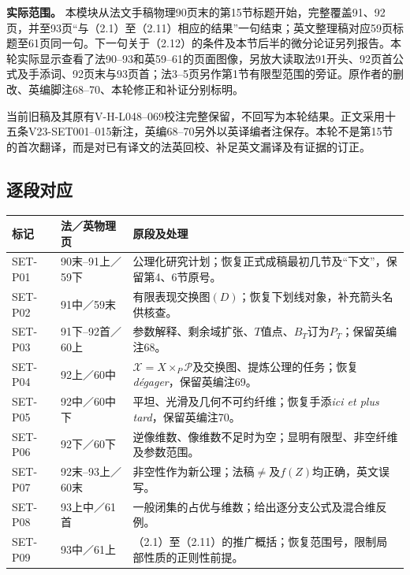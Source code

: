 
\noindent\textbf{实际范围。}
本模块从法文手稿物理90页末的第15节标题开始，完整覆盖91、92页，并至93页“与（2.1）至（2.11）相应的结果”一句结束；英文整理稿对应59页标题至61页同一句。下一句关于（2.12）的条件及本节后半的微分论证另列报告。本轮实际显示查看了法90--93和英59--61的页面图像，另放大读取法91开头、92页首公式及手添词、92页末与93页首；法3--5页另作第1节有限型范围的旁证。原作者的删改、英编脚注68--70、本轮修正和补证分别标明。

当前旧稿及其原有V-H-L048--069校注完整保留，不回写为本轮结果。正文采用十五条V23-SET001--015新注，英编68--70另外以英译编者注保存。本轮不是第15节的首次翻译，而是对已有译文的法英回校、补足英文漏译及有证据的订正。

\subsection*{逐段对应}
\begin{longtable}{@{}p{.14\linewidth}p{.18\linewidth}p{.57\linewidth}@{}}
\toprule 标记 & 法／英物理页 & 原段及处理\\\midrule\endhead
SET-P01 & 90末--91上／59下 & 公理化研究计划；恢复正式成稿最初几节及“下文”，保留第4、6节原号。\\
SET-P02 & 91中／59末 & 有限表现交换图$(D)$；恢复下划线对象，补充箭头名供核查。\\
SET-P03 & 91下--92首／60上 & 参数解释、剩余域扩张、$T$值点、$B_T$订为$P_T$；保留英编注68。\\
SET-P04 & 92上／60中 & $\mathcal X=X\times_P\mathcal P$及交换图、提炼公理的任务；恢复\textit{dégager}，保留英编注69。\\
SET-P05 & 92中／60中下 & 平坦、光滑及几何不可约纤维；恢复手添\textit{ici et plus tard}，保留英编注70。\\
SET-P06 & 92下／60下 & 逆像维数、像维数不足时为空；显明有限型、非空纤维及参数范围。\\
SET-P07 & 92末--93上／60末 & 非空性作为新公理；法稿$\ne$及$f(Z)$均正确，英文误写。\\
SET-P08 & 93上中／61首 & 一般闭集的占优与维数；给出逐分支公式及混合维反例。\\
SET-P09 & 93中／61上 & （2.1）至（2.11）的推广概括；恢复范围号，限制局部性质的正则性前提。\\
\bottomrule
\end{longtable}

